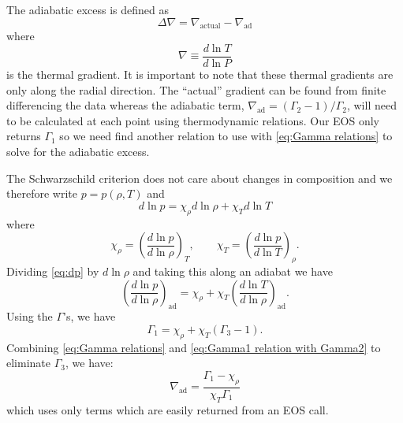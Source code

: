 The adiabatic excess is defined as
\begin{equation}\label{eq:adiabatic excess}
  \Delta\nabla = \nabla_\text{actual} - \nabla_\text{ad}
\end{equation}
where
\begin{equation}\label{eq:thermal gradient}
  \nabla \equiv \frac{d\ln T}{d\ln P}
\end{equation}
is the thermal gradient.  It is important to note that these thermal
gradients are only along the radial direction.  The ``actual''
gradient can be found from finite differencing the data whereas the
adiabatic term, $\nabla_\text{ad} = \left(\Gamma_2-1\right) /
\Gamma_2$, will need to be calculated at each point using
thermodynamic relations.  Our EOS only returns $\Gamma_1$ so we need
find another relation to use with \eqref{eq:Gamma relations} to solve
for the adiabatic excess.  

The Schwarzschild criterion does not care about changes in composition
and we therefore write $p = p(\rho,T)$ and
\begin{equation}\label{eq:dp}
  d\ln p = \chi_\rho d\ln\rho + \chi_T d\ln T
\end{equation}
where
\[
\chi_\rho = \left(\frac{d\ln p}{d\ln\rho}\right)_T,\qquad
\chi_T = \left(\frac{d\ln p}{d\ln T}\right)_\rho.
\]
Dividing \eqref{eq:dp} by $d\ln\rho$ and taking this along an adiabat
we have
\begin{equation}\label{eq:dp2}
  \left(\frac{d\ln p}{d\ln\rho}\right)_\text{ad} = \chi_\rho + \chi_T
  \left(\frac{d\ln T}{d\ln\rho}\right)_\text{ad}.
\end{equation}
Using the $\Gamma$'s, we have
\begin{equation}\label{eq:Gamma1 relation with Gamma2}
  \Gamma_1 = \chi_\rho + \chi_T\left(\Gamma_3-1\right).
\end{equation}
Combining \eqref{eq:Gamma relations} and \eqref{eq:Gamma1 relation
  with Gamma2} to eliminate $\Gamma_3$, we have:
\begin{equation}\label{eq:nabla_ad}
  \nabla_\text{ad} = \frac{\Gamma_1 - \chi_\rho}{\chi_T\Gamma_1}
\end{equation}
which uses only terms which are easily returned from an EOS call.


